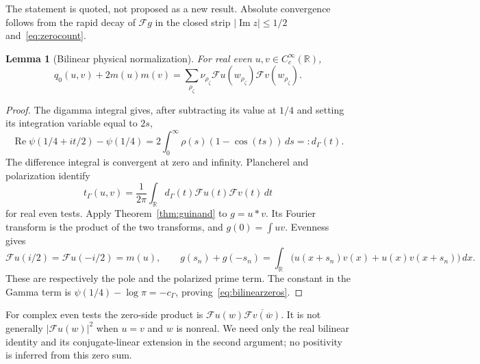 \documentclass[11pt,a4paper]{article}
\numberwithin{equation}{section}
\newtheorem{lemma}[theorem]{Lemma}
\theoremstyle{remark}
\newcommand{\R}{\mathbb R}
\newcommand{\tg}{t_{\Gamma}}
\newcommand{\cg}{c_{\Gamma}}
\begin{document}
The statement is quoted, not proposed as a new result. Absolute convergence follows from the rapid decay of $\mathcal Fg$ in the closed strip $|\operatorname{Im}z|\le1/2$ and~\eqref{eq:zerocount}.

\begin{lemma}[Bilinear physical normalization]\label{lem:bilinear}
For real even $u,v\in C_c^\infty(\R)$,
\begin{equation}\label{eq:bilinearzeros}
 q_0(u,v)+2m(u)m(v)
   =\sum_{\rho_\zeta}\nu_{\rho_\zeta}
       \mathcal Fu(w_{\rho_\zeta})\mathcal Fv(w_{\rho_\zeta}).
\end{equation}
\end{lemma}
\begin{proof}
The digamma integral \cite[Eq.~5.9.16]{DLMF} gives, after subtracting its value at $1/4$ and setting its integration variable equal to $2s$,
\begin{equation}\label{eq:digammamultiplier}
 \operatorname{Re}\psi(1/4+it/2)-\psi(1/4)
    =2\int_0^\infty\rho(s)(1-\cos(ts))\,ds=:d_\Gamma(t).
\end{equation}
The difference integral is convergent at zero and infinity. Plancherel and polarization identify
\[
 \tg(u,v)=\frac1{2\pi}\int_\R
       d_\Gamma(t)\mathcal Fu(t)\mathcal Fv(t)\,dt
\]
for real even tests. Apply Theorem~\ref{thm:guinand} to $g=u*v$. Its Fourier transform is the product of the two transforms, and $g(0)=\int uv$. Evenness gives
\[
 \mathcal Fu(i/2)=\mathcal Fu(-i/2)=m(u),\qquad
 g(s_n)+g(-s_n)
  =\int_\R\bigl(u(x+s_n)v(x)+u(x)v(x+s_n)\bigr)\,dx.
\]
These are respectively the pole and the polarized prime term. The constant in the Gamma term is $\psi(1/4)-\log\pi=-\cg$, proving~\eqref{eq:bilinearzeros}.
\end{proof}

For complex even tests the zero-side product is
$\mathcal Fu(w)\overline{\mathcal Fv(\overline w)}$. It is not generally $|\mathcal Fu(w)|^2$ when $u=v$ and $w$ is nonreal. We need only the real bilinear identity and its conjugate-linear extension in the second argument; no positivity is inferred from this zero sum.
\end{document}
